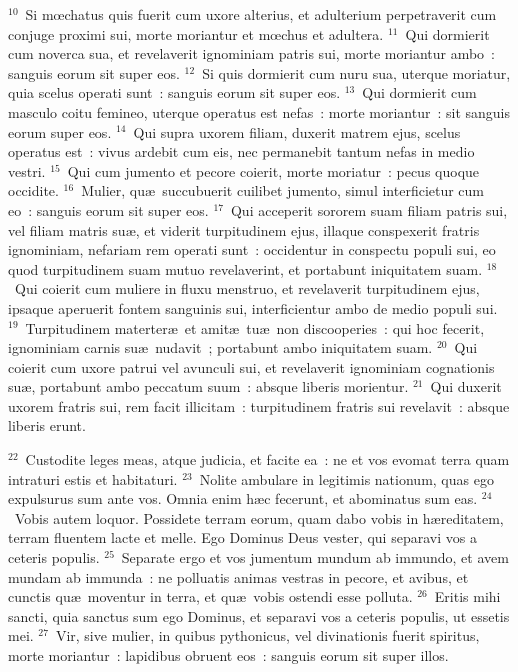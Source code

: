 ${}^{10}$~Si mœchatus quis fuerit cum uxore alterius, et adulterium perpetraverit cum conjuge proximi sui, morte moriantur et mœchus et adultera.
${}^{11}$~Qui dormierit cum noverca sua, et revelaverit ignominiam patris sui, morte moriantur ambo~: sanguis eorum sit super eos.
${}^{12}$~Si quis dormierit cum nuru sua, uterque moriatur, quia scelus operati sunt~: sanguis eorum sit super eos.
${}^{13}$~Qui dormierit cum masculo coitu femineo, uterque operatus est nefas~: morte moriantur~: sit sanguis eorum super eos.
${}^{14}$~Qui supra uxorem filiam, duxerit matrem ejus, scelus operatus est~: vivus ardebit cum eis, nec permanebit tantum nefas in medio vestri.
${}^{15}$~Qui cum jumento et pecore coierit, morte moriatur~: pecus quoque occidite.
${}^{16}$~Mulier, qu\ae\ succubuerit cuilibet jumento, simul interficietur cum eo~: sanguis eorum sit super eos.
${}^{17}$~Qui acceperit sororem suam filiam patris sui, vel filiam matris su\ae , et viderit turpitudinem ejus, illaque conspexerit fratris ignominiam, nefariam rem operati sunt~: occidentur in conspectu populi sui, eo quod turpitudinem suam mutuo revelaverint, et portabunt iniquitatem suam.
${}^{18}$~Qui coierit cum muliere in fluxu menstruo, et revelaverit turpitudinem ejus, ipsaque aperuerit fontem sanguinis sui, interficientur ambo de medio populi sui.
${}^{19}$~Turpitudinem materter\ae\ et amit\ae\ tu\ae\ non discooperies~: qui hoc fecerit, ignominiam carnis su\ae\ nudavit~; portabunt ambo iniquitatem suam.
${}^{20}$~Qui coierit cum uxore patrui vel avunculi sui, et revelaverit ignominiam cognationis su\ae , portabunt ambo peccatum suum~: absque liberis morientur.
${}^{21}$~Qui duxerit uxorem fratris sui, rem facit illicitam~: turpitudinem fratris sui revelavit~: absque liberis erunt.


${}^{22}$~Custodite leges meas, atque judicia, et facite ea~: ne et vos evomat terra quam intraturi estis et habitaturi.
${}^{23}$~Nolite ambulare in legitimis nationum, quas ego expulsurus sum ante vos. Omnia enim h\ae c fecerunt, et abominatus sum eas.
${}^{24}$~Vobis autem loquor. Possidete terram eorum, quam dabo vobis in h\ae reditatem, terram fluentem lacte et melle. Ego Dominus Deus vester, qui separavi vos a ceteris populis.
${}^{25}$~Separate ergo et vos jumentum mundum ab immundo, et avem mundam ab immunda~: ne polluatis animas vestras in pecore, et avibus, et cunctis qu\ae\ moventur in terra, et qu\ae\ vobis ostendi esse polluta.
${}^{26}$~Eritis mihi sancti, quia sanctus sum ego Dominus, et separavi vos a ceteris populis, ut essetis mei.
${}^{27}$~Vir, sive mulier, in quibus pythonicus, vel divinationis fuerit spiritus, morte moriantur~: lapidibus obruent eos~: sanguis eorum sit super illos.

